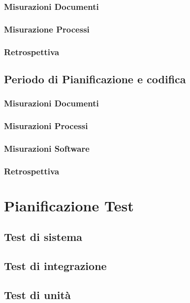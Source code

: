 \documentclass[a4paper, oneside, openany, dvipsnames, table]{article}
\begin{document}
		\subsubsection{Misurazioni Documenti}
			
		\subsubsection{Misurazione Processi}
			
		\subsubsection{Retrospettiva}
			

\newpage
	\subsection{Periodo di Pianificazione e codifica}
		\subsubsection{Misurazioni Documenti}
			
		\subsubsection{Misurazioni Processi}
			
		\subsubsection{Misurazioni Software}
			
		\subsubsection{Retrospettiva}
			

\newpage
\section{Pianificazione Test}
\subsection{Test di sistema}
	
\subsection{Test di integrazione}
	
\subsection{Test di unità}
	
	
% 		
% 		
\end{document}

